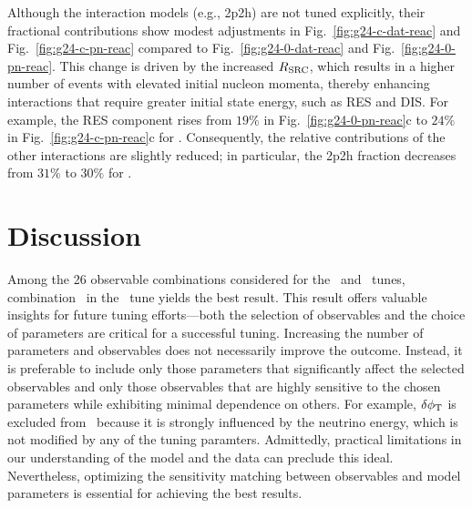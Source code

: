     Although the interaction models (e.g., 2p2h) are not tuned explicitly, their fractional contributions show modest adjustments in Fig.~\ref{fig:g24-c-dat-reac} and Fig.~\ref{fig:g24-c-pn-reac} compared to Fig.~\ref{fig:g24-0-dat-reac} and Fig.~\ref{fig:g24-0-pn-reac}. 
    This change is driven by the increased $R_\textrm{SRC}$, which results in a higher number of events with elevated initial nucleon momenta, thereby enhancing interactions that require greater initial state energy, such as RES and DIS. 
    For example, the RES component rises from $19\%$ in Fig.~\ref{fig:g24-0-pn-reac}c to $24\%$ in Fig.~\ref{fig:g24-c-pn-reac}c for \minzpi. 
    Consequently, the relative contributions of the other interactions are slightly reduced; in particular, the 2p2h fraction decreases from $31\%$ to $30\%$ for \minzpi.

\section{Discussion}
Among the 26 observable combinations considered for the \allpar\ and \redpar\ tunes, combination \cbRedPar\ in the \redpar\ tune yields the best result.
This result offers valuable insights for future tuning efforts—both the selection of observables and the choice of parameters are critical for a successful tuning.
Increasing the number of parameters and observables does not necessarily improve the outcome.
Instead, it is preferable to include only those parameters that significantly affect the selected observables and only those observables that are highly sensitive to the chosen parameters while exhibiting minimal dependence on others.
For example, $\delta\phi_\textrm{T}$ is excluded from \cbRedPar\ because it is strongly influenced by the neutrino energy, which is not modified by any of the tuning paramters.
Admittedly, practical limitations in our understanding of the model and the data can preclude this ideal.
Nevertheless, optimizing the sensitivity matching between observables and model parameters is essential for achieving the best results.

